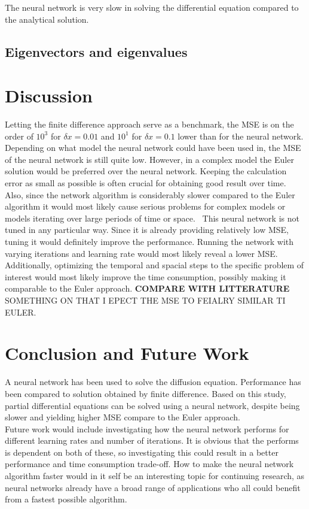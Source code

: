 \documentclass[a4paper,11pt,twocolumn]{article}
\begin{document}
The neural network is very slow in solving the differential equation compared to the analytical solution.
\subsection{Eigenvectors and eigenvalues}


\section{Discussion}
Letting the finite difference approach serve as a benchmark, the MSE is on the order of $10^3$ for $\delta x = 0.01$ and $10^1$ for $\delta x = 0.1$ lower than for the neural network. Depending on what model the neural network could have been used in, the MSE of the neural network is still quite low. However, in a complex model the Euler solution would be preferred over the neural network. Keeping the calculation error as small as possible is often crucial for obtaining good result over time. Also, since the network algorithm is considerably slower compared to the Euler algorithm it would most likely cause serious problems for complex models or models iterating over large periods of time or space. 
\
This neural network is not tuned in any particular way. Since it is already providing relatively low MSE, tuning it would definitely improve the performance. Running the network with varying iterations and learning rate would most likely reveal a lower MSE. Additionally, optimizing the temporal and spacial steps to the specific problem of interest would most likely improve the time consumption, possibly making it comparable to the Euler approach.      
\textbf{COMPARE WITH LITTERATURE}
SOMETHING ON THAT I EPECT THE MSE TO FEIALRY SIMILAR TI EULER. 

\section{Conclusion and Future Work}

A neural network has been used to solve the diffusion equation. Performance has been compared to solution obtained by finite difference. Based on this study, partial differential equations can be solved using a neural network, despite being slower and yielding higher MSE compare to the Euler approach. 
\\
Future work would include investigating how the neural network performs for different learning rates and number of iterations. It is obvious that the performs is dependent on both of these, so investigating this could result in a better performance and time consumption trade-off. How to make the neural network algorithm faster would in it self be an interesting topic for continuing research, as neural networks already have a broad range of applications who all could benefit from a fastest possible algorithm. 
\end{document}
